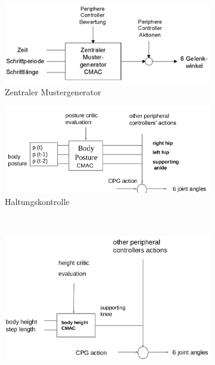 \begin{figure}
	\begin{subfigure}{.5\textwidth}
		\centering
		\includegraphics[width=\textwidth]{figures/zentraler_mustergenerator.png}
		\caption{Zentraler Mustergenerator}
		\label{ch:09:fig:zentraler-mustergenerator}
	\end{subfigure}
	\begin{subfigure}{.5\textwidth}
		\centering
		\includegraphics[width=\textwidth]{figures/haltungskontrolle.png}
		\caption{Haltungskontrolle}
		\label{ch:09:fig:haltungskontrolle}
	\end{subfigure} \\
	\begin{subfigure}{.5\textwidth}
		\centering
		\includegraphics[width=\textwidth]{figures/koerperhoehe.png}

\end{subfigure}
\end{figure}
